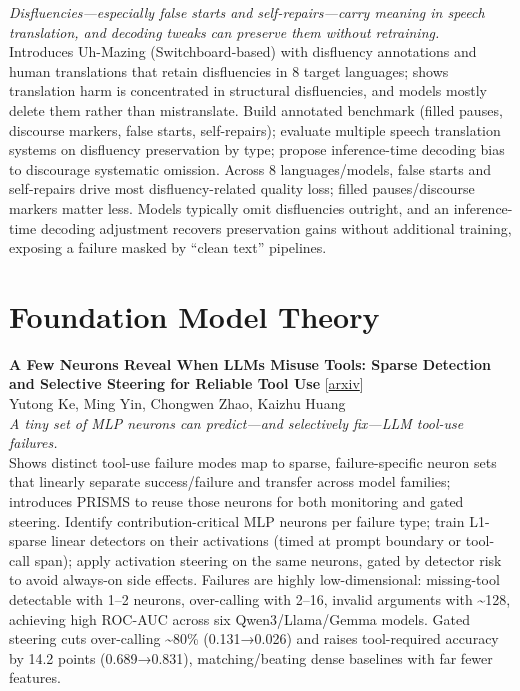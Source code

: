 \documentclass[12pt,letterpaper]{article}
\begin{document}
{\small\textit{Disfluencies---especially false starts and self-repairs---carry meaning in speech translation, and decoding tweaks can preserve them without retraining.}}\\[1pt]
{\footnotesize Introduces Uh-Mazing (Switchboard-based) with disfluency annotations and human translations that retain disfluencies in 8 target languages; shows translation harm is concentrated in structural disfluencies, and models mostly delete them rather than mistranslate. Build annotated benchmark (filled pauses, discourse markers, false starts, self-repairs); evaluate multiple speech translation systems on disfluency preservation by type; propose inference-time decoding bias to discourage systematic omission. Across 8 languages/models, false starts and self-repairs drive most disfluency-related quality loss; filled pauses/discourse markers matter less. Models typically omit disfluencies outright, and an inference-time decoding adjustment recovers preservation gains without additional training, exposing a failure masked by ``clean text'' pipelines.}

\medskip


\section*{Foundation Model Theory}

{\small\textbf{A Few Neurons Reveal When LLMs Misuse Tools: Sparse Detection and Selective Steering for Reliable Tool Use}} {\scriptsize[\href{https://arxiv.org/abs/2608.00218}{arxiv}]}\\
{\scriptsize Yutong Ke, Ming Yin, Chongwen Zhao, Kaizhu Huang}\\

{\small\textit{A tiny set of MLP neurons can predict---and selectively fix---LLM tool-use failures.}}\\[1pt]
{\footnotesize Shows distinct tool-use failure modes map to sparse, failure-specific neuron sets that linearly separate success/failure and transfer across model families; introduces PRISMS to reuse those neurons for both monitoring and gated steering. Identify contribution-critical MLP neurons per failure type; train L1-sparse linear detectors on their activations (timed at prompt boundary or tool-call span); apply activation steering on the same neurons, gated by detector risk to avoid always-on side effects. Failures are highly low-dimensional: missing-tool detectable with 1--2 neurons, over-calling with 2--16, invalid arguments with \textasciitilde{}128, achieving high ROC-AUC across six Qwen3/Llama/Gemma models. Gated steering cuts over-calling \textasciitilde{}80\% (0.131→0.026) and raises tool-required accuracy by 14.2 points (0.689→0.831), matching/beating dense baselines with far fewer features.}
\end{document}
